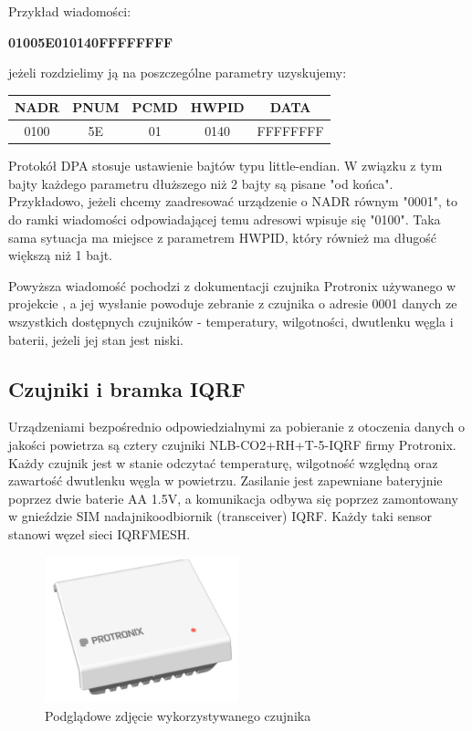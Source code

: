 Przykład wiadomości:

\begin{center}
    \textbf{01005E010140FFFFFFFF}
\end{center}

jeżeli rozdzielimy ją na poszczególne parametry uzyskujemy:

\begin{table}[h]
    \centering
    \begin{tabular}{|c|c|c|c|c|}
    \hline
    NADR & PNUM & PCMD & HWPID & DATA \\ \hline
    0100 & 5E & 01 & 0140 & FFFFFFFF \\ \hline
    \end{tabular}
\end{table}

Protokół DPA stosuje ustawienie bajtów typu little-endian. W związku z tym bajty każdego parametru dłuższego
niż 2 bajty są pisane "od końca". Przykładowo, jeżeli chcemy zaadresować urządzenie o NADR równym "0001", to 
do ramki wiadomości odpowiadającej temu adresowi wpisuje się "0100". Taka sama sytuacja ma miejsce z parametrem
HWPID, który również ma długość większą niż 1 bajt.

Powyższa wiadomość pochodzi z dokumentacji czujnika Protronix używanego w projekcie \cite{protronix-comms}, a jej 
wysłanie powoduje zebranie z czujnika o adresie 0001 danych ze wszystkich dostępnych czujników - temperatury, 
wilgotności, dwutlenku węgla i baterii, jeżeli jej stan jest niski.

\subsection{Czujniki i bramka IQRF}

Urządzeniami bezpośrednio odpowiedzialnymi za pobieranie z otoczenia danych o jakości powietrza są cztery czujniki NLB-CO2+RH+T-5-IQRF firmy
Protronix. Każdy czujnik jest w stanie odczytać temperaturę, wilgotność względną oraz zawartość dwutlenku węgla w powietrzu. Zasilanie jest zapewniane
bateryjnie poprzez dwie baterie AA 1.5V, a komunikacja odbywa się poprzez zamontowany w gnieździe SIM nadajnikoodbiornik (transceiver) IQRF. Każdy taki sensor stanowi węzeł sieci IQRFMESH.

\begin{figure}[H]
    \centering
    \includegraphics[width=0.5\textwidth]{zdj/NLB-CO2RHT-5-IQRF.jpg}
    \caption{Podglądowe zdjęcie wykorzystywanego czujnika \cite{protronix-product}}
\end{figure}

